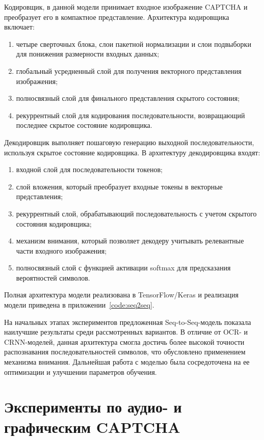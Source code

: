 Кодировщик, в данной модели принимает входное изображение CAPTCHA и преобразует 
его в компактное представление. Архитектура кодировщика включает:
\begin{enumerate}
    \item четыре сверточных блока, слои пакетной нормализации и слои подвыборки 
    для понижения размерности входных данных;
    \item глобальный усредненный слой для получения векторного представления 
    изображения;
    \item полносвязный слой для финального представления скрытого состояния;
    \item рекуррентный слой для кодирования последовательности, возвращающий 
    последнее скрытое состояние кодировщика.
\end{enumerate}

Декодировщик выполняет пошаговую генерацию выходной последовательности, используя 
скрытое состояние кодировщика. В архитектуру декодировщика входят:
\begin{enumerate}
    \item входной слой для последовательности токенов;
    \item слой вложения, который преобразует входные токены в векторные 
    представления;
    \item рекуррентный слой, обрабатывающий последовательность с учетом скрытого 
    состояния кодировщика;
    \item механизм внимания, который позволяет декодеру учитывать релевантные 
    части входного изображения;
    \item полносвязный слой с функцией активации softmax для предсказания 
    вероятностей символов.
\end{enumerate}

Полная архитектура модели реализована в TensorFlow/Keras и реализация модели 
приведена в приложении~\ref{code:seq2seq}.

На начальных этапах экспериментов предложенная Seq-to-Seq-модель показала 
наилучшие результаты среди рассмотренных вариантов. В отличие от OCR- и 
CRNN-моделей, данная архитектура смогла достичь более высокой точности 
распознавания последовательностей символов, что обусловлено применением 
механизма внимания. Дальнейшая работа с моделью была сосредоточена на ее 
оптимизации и улучшении параметров обучения.

\section{Эксперименты по аудио- и графическим CAPTCHA}

